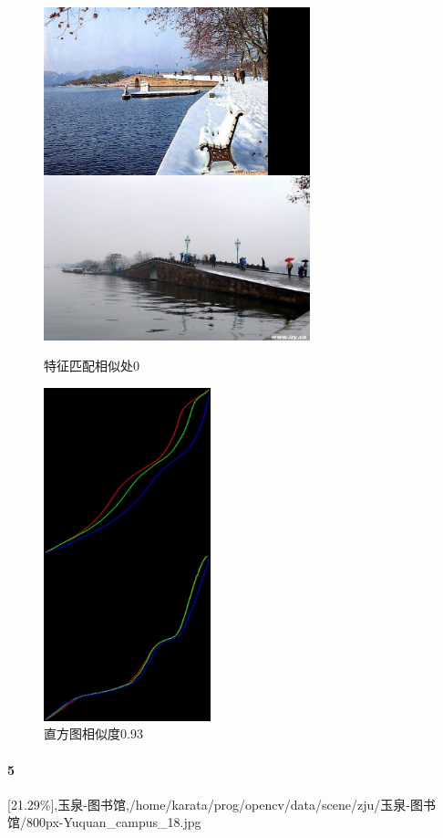 \begin{figure}[htb]
\begin{minipage}[t]{0.5\linewidth}
\centering
\includegraphics[height=3.8in]{断桥.jpg.d/im4sift.jpg}
\caption{特征匹配相似处0}
\label{fig:side:a}
\end{minipage}%
\begin{minipage}[t]{0.5\linewidth}
\centering
\includegraphics[height=3.8in]{断桥.jpg.d/im4hist2.jpg}
\caption{直方图相似度0.93}
\label{fig:side:a}
\end{minipage}%
\end{figure}

\paragraph{5}
[21.29\%],玉泉-图书馆,/home/karata/prog/opencv/data/scene/zju/玉泉-图书馆/800px-Yuquan\_campus\_18.jpg

